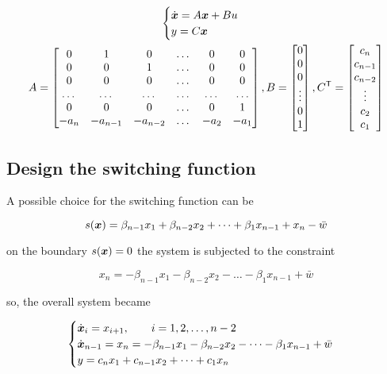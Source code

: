 \begin{gather*}
    \begin{cases}
        \dot{\boldsymbol{x}} = A \boldsymbol{x} + B u \\
        y = C \boldsymbol{x}
    \end{cases} \\
    A = \begin{bmatrix}
            0 & 1 & 0 & \dots & 0 & 0 \\
            0 & 0 & 1 & \dots & 0 & 0 \\
            0 & 0 & 0 & \dots & 0 & 0 \\
            \dots & \dots & \dots & \dots & \dots & \dots \\
            0 & 0 & 0 & \dots & 0 & 1 \\
            -a_n & -a_{n-1} & -a_{n-2} & \dots & -a_2 & -a_1
    \end{bmatrix},
    B = \begin{bmatrix} 0 \\ 0 \\ 0 \\ \vdots \\ 0 \\ 1 \end{bmatrix},
    C^{\mathsf{T}} = \begin{bmatrix} c_n \\ c_{n-1} \\ c_{n-2} \\ \vdots \\ c_2 \\ c_1 \end{bmatrix}
\end{gather*}

\subsection{Design the switching function}

A possible choice for the switching function can be

\[
    s(\boldsymbol{x}) = \beta_{n-1} x_1 + \beta_{n-2} x_2 + \dots + \beta_1 x_{n-1} + x_n - \bar w
\]

on the boundary $s(\boldsymbol{x})=0$ the system is subjected to the constraint

\[
    x_n = - \beta_{n-1} x_1 - \beta_{n-2} x_2 - \dots - \beta_1 x_{n-1} + \bar w
\]

so, the overall system became

\[
    \begin{cases}
        \dot{\boldsymbol{x}}_i = x_{i+1}, \qquad i = 1,2,\dots, n-2 \\
        \dot{\boldsymbol{x}}_{n-1} = x_n = - \beta_{n-1} x_1 - \beta_{n-2} x_2 - \dots - \beta_1 x_{n-1} + \bar w \\
        y = c_n x_1 + c_{n-1} x_2 + \dots + c_1 x_n
    \end{cases}
\]

